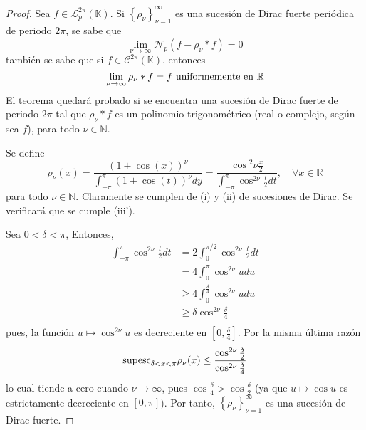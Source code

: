 \documentclass[12pt]{report}
\theoremstyle{largebreak}
\newcommand{\N}[2]{\ensuremath{\mathcal{N}_{#1}\left(#2\right)}}
\begin{document}
    \begin{proof}
        Sea $f\in\mathcal{L}_p^{2\pi}(\mathbb{K})$. Si $\left\{\rho_\nu \right\}_{\nu=1}^\infty$ es una sucesión de Dirac fuerte periódica de periodo $2\pi$, se sabe que
        \begin{equation*}
            \lim_{\nu\rightarrow\infty}\N{p}{f-\rho_\nu*f}=0
        \end{equation*}
        también se sabe que si $f\in\mathcal{C}^{2\pi}(\mathbb{K})$, entonces
        \begin{equation*}
            \lim_{\nu\rightarrow\infty}\rho_\nu*f=f\textup{ uniformemente en }\mathbb{R}
        \end{equation*}
        El teorema quedará probado si se encuentra una sucesión de Dirac fuerte de periodo $2\pi$ tal que $\rho_\nu*f$ es un polinomio trigonométrico (real o complejo, según sea $f$), para todo $\nu\in\mathbb{N}$.

        Se define
        \begin{equation*}
            \rho_\nu(x)=\frac{(1+\cos(x))^\nu}{\int_{-\pi}^\pi(1+\cos(t))^\nu dy}=\frac{\cos{^2\nu}\frac{x}{2}}{\int_{-\pi}^\pi\cos^{2\nu}\frac{t}{2}dt},\quad\forall x\in\mathbb{R}
        \end{equation*}
        para todo $\nu\in\mathbb{N}$. Claramente se cumplen de (i) y (ii) de sucesiones de Dirac. Se verificará que se cumple (iii').

        Sea $0<\delta<\pi$, Entonces,
        \begin{equation*}
            \begin{split}
                \int_{-\pi}^{\pi}\cos^{2\nu}\frac{t}{2}dt&=2\int_0^{\pi/2} \cos^{2\nu}\frac{t}{2}dt\\
                &=4\int_0^\pi\cos^{2\nu}udu\\
                &\geq 4\int_0^{\frac{\delta}{4}}\cos^{2\nu}udu\\
                &\geq\delta\cos^{2\nu}\frac{\delta}{4}\\
            \end{split}
        \end{equation*}
        pues, la función $u\mapsto\cos^{2\nu}u$ es decreciente en $\left[0,\frac{\delta}{4}\right]$. Por la misma última razón
        \begin{equation*}
            \begin{split}
                \textup{supesc}_{\delta<x<\pi}\rho_\nu(x)\leq\frac{\cos^{2\nu}\frac{\delta}{2}}{\cos^{2\nu}\frac{\delta}{4}}
            \end{split}
        \end{equation*}
        lo cual tiende a cero cuando $\nu\rightarrow\infty$, pues $\cos\frac{\delta}{4}>\cos\frac{\delta}{2}$ (ya que $u\mapsto \cos u$ es estrictamente decreciente en $[0,\pi]$). Por tanto, $\left\{\rho_\nu \right\}_{\nu=1}^\infty$ es una sucesión de Dirac fuerte.


\end{proof}
\end{document}
